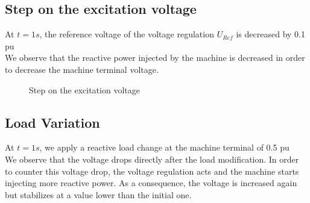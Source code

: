 \documentclass[a4paper, 12pt]{report}
\begin{document}
\newpage
\subsection{Step on the excitation voltage}

At $t=1s$, the reference voltage of the voltage regulation $U_{Ref}$ is decreased by 0.1 pu\\

We observe that the reactive power injected by the machine is decreased in order to decrease the machine terminal voltage.\\

\begin{figure}[H]
\caption{Step on the excitation voltage}
\end{figure}

\newpage
\subsection{Load Variation}

At $t=1s$, we apply a reactive load change at the machine terminal of 0.5 pu\\

We observe that the voltage drops directly after the load modification. In order to counter this voltage drop, the voltage regulation acts and the machine starts injecting more reactive power. As a consequence, the voltage is increased again but stabilizes at a value lower than the initial one. \\
\end{document}
